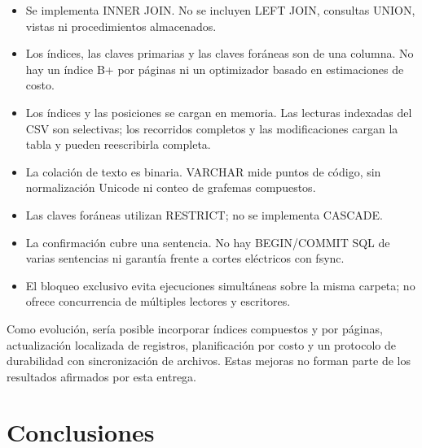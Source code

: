 \documentclass[11pt,a4paper]{article}
\begin{document}
\begin{itemize}
  \item Se implementa INNER JOIN. No se incluyen LEFT JOIN, consultas
        UNION, vistas ni procedimientos almacenados.
  \item Los índices, las claves primarias y las claves foráneas son de
        una columna. No hay un índice B+ por páginas ni un optimizador
        basado en estimaciones de costo.
  \item Los índices y las posiciones se cargan en memoria. Las lecturas
        indexadas del CSV son selectivas; los recorridos completos y las
        modificaciones cargan la tabla y pueden reescribirla completa.
  \item La colación de texto es binaria. VARCHAR mide puntos de código,
        sin normalización Unicode ni conteo de grafemas compuestos.
  \item Las claves foráneas utilizan RESTRICT; no se implementa CASCADE.
  \item La confirmación cubre una sentencia. No hay BEGIN/COMMIT SQL de
        varias sentencias ni garantía frente a cortes eléctricos con fsync.
  \item El bloqueo exclusivo evita ejecuciones simultáneas sobre la misma
        carpeta; no ofrece concurrencia de múltiples lectores y escritores.
\end{itemize}

Como evolución, sería posible incorporar índices compuestos y por páginas,
actualización localizada de registros, planificación por costo y un
protocolo de durabilidad con sincronización de archivos. Estas mejoras
no forman parte de los resultados afirmados por esta entrega.

\section{Conclusiones}
\end{document}
